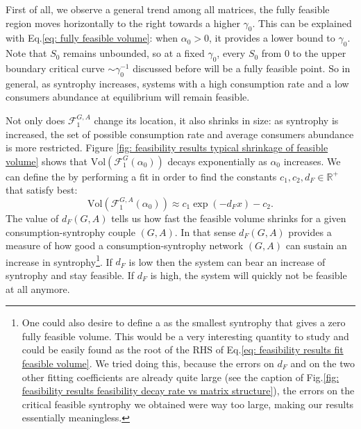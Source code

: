 \documentclass[12pt, titlepage]{report}
\begin{document}
  First of all, we observe a general trend among all matrices, the fully feasible region moves horizontally to the right towards a higher $\gamma_0$. This can be explained with Eq.\eqref{eq: fully feasible volume}: when $\alpha_0 > 0$, it provides a lower bound to $\gamma_0$. Note that $S_0$ remains unbounded, so at a fixed $\gamma_0$, every $S_0$ from $0$ to the upper boundary critical curve $\sim \gamma_0^{-1}$ discussed before will be a fully feasible point. So in general, as syntrophy increases, systems with a high consumption rate and a low consumers abundance at equilibrium will remain feasible.

  Not only does $\mathcal{F}^{G,A}_1$ change its location, it also shrinks in size: as syntrophy is increased, the set of possible consumption rate and average consumers abundance is more restricted. Figure \ref{fig: feasibility results typical shrinkage of feasible volume} shows that $\text{Vol}\left(\mathcal{F}_1^G(\alpha_0)\right)$ decays exponentially as $\alpha_0$ increases.
We can define the  by performing a fit in order to find the constants $c_1,c_2, d_F \in \mathbb{R}^+$ that satisfy best:
  \begin{equation}
\text{Vol}\left(\mathcal{F}_1^{G,A}(\alpha_0)\right) \approx c_1 \exp{\left(-d_F x\right)} - c_2. \label{eq: feasibility results fit feasible volume}
  \end{equation}
  The value of $d_F(G,A)$ tells us how fast the feasible volume shrinks for a given consumption-syntrophy couple $(G,A)$. In that sense $d_F(G,A)$ provides a measure of how good a consumption-syntrophy network $(G,A)$ can sustain an increase in syntrophy\footnote{One could also desire to define a  as the smallest syntrophy that gives a zero fully feasible volume. This would be a very interesting quantity to study and could be easily found as the root of the RHS of Eq.\eqref{eq: feasibility results fit feasible volume}. We tried doing this, because the errors on $d_F$ and on the two other fitting coefficients are already quite large (see the caption of Fig.\ref{fig: feasibility results feasibility decay rate vs matrix structure}), the errors on the critical feasible syntrophy we obtained were way too large, making our results essentially meaningless.}. If $d_F$ is low then the system can bear an increase of syntrophy and stay feasible. If $d_F$ is high, the system will quickly not be feasible at all anymore.
\end{document}
